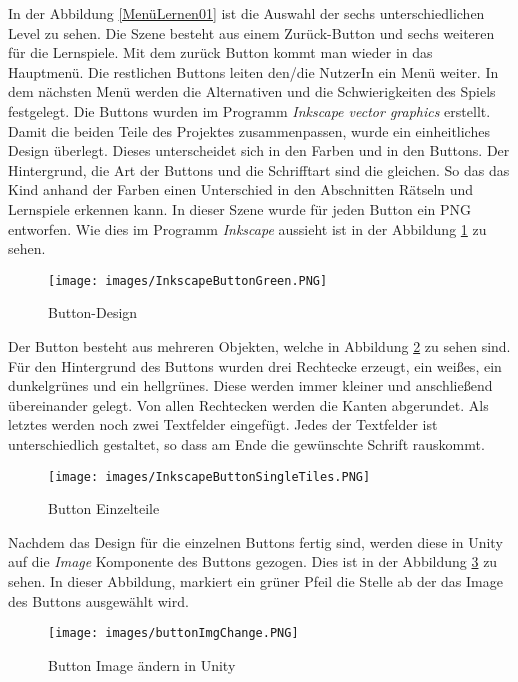 In der Abbildung \ref{MenüLernen01} ist die Auswahl der sechs unterschiedlichen Level zu sehen. Die Szene besteht aus einem Zurück-Button und sechs weiteren für die Lernspiele. Mit dem zurück Button kommt man wieder in das Hauptmenü. Die restlichen Buttons leiten den/die NutzerIn ein Menü weiter. In dem nächsten Menü werden die Alternativen und die Schwierigkeiten des Spiels festgelegt. Die Buttons wurden im Programm \textit{Inkscape vector graphics} erstellt. Damit die beiden Teile des Projektes zusammenpassen, wurde ein einheitliches Design überlegt. Dieses unterscheidet sich in den Farben und in den Buttons. Der Hintergrund, die Art der Buttons und die Schrifftart sind die gleichen. So das das Kind anhand der Farben einen Unterschied in den Abschnitten Rätseln und Lernspiele erkennen kann. In dieser Szene wurde für jeden Button ein PNG entworfen. Wie dies im Programm \textit{Inkscape} aussieht ist in der Abbildung \ref{ButtonInkscape} zu sehen.\\
\begin{figure}[htbp]
  \centering
  \texttt{[image: images/InkscapeButtonGreen.PNG]}
  \caption{Button-Design}
  \label{ButtonInkscape}
\end{figure}Der Button besteht aus mehreren Objekten, welche in Abbildung \ref{ButtonInkscapeSingleTiles} zu sehen sind. Für den Hintergrund des Buttons wurden drei Rechtecke erzeugt, ein weißes, ein dunkelgrünes und ein hellgrünes. Diese werden immer kleiner und anschließend übereinander gelegt. Von allen Rechtecken werden die Kanten abgerundet. Als letztes werden noch zwei Textfelder eingefügt. Jedes der Textfelder ist unterschiedlich gestaltet, so dass am Ende die gewünschte Schrift rauskommt. 
\begin{figure}[htbp]
  \centering
  \texttt{[image: images/InkscapeButtonSingleTiles.PNG]}
  \caption{Button Einzelteile}
  \label{ButtonInkscapeSingleTiles}
\end{figure}
Nachdem das Design für die einzelnen Buttons fertig sind, werden diese in Unity auf die \textit{Image} Komponente des Buttons gezogen. Dies ist in der Abbildung \ref{UnityButtonImgChange} zu sehen.
In dieser Abbildung, markiert ein grüner Pfeil die Stelle ab der das Image des Buttons ausgewählt wird.
\begin{figure}[htbp]
  \centering
  \texttt{[image: images/buttonImgChange.PNG]}
  \caption{Button Image ändern in Unity}
  \label{UnityButtonImgChange}
\end{figure}
